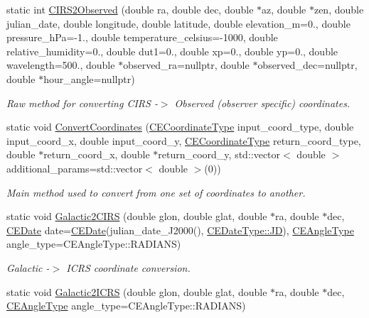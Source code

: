 \begin{DoxyCompactItemize}
static int \hyperlink{class_c_e_coordinates_aa77d308ed8537f8cd42df293e51c5eb6}{C\+I\+R\+S2\+Observed} (double ra, double dec, double $\ast$az, double $\ast$zen, double julian\+\_\+date, double longitude, double latitude, double elevation\+\_\+m=0., double pressure\+\_\+h\+Pa=-\/1., double temperature\+\_\+celsius=-\/1000, double relative\+\_\+humidity=0., double dut1=0., double xp=0., double yp=0., double wavelength=500., double $\ast$observed\+\_\+ra=nullptr, double $\ast$observed\+\_\+dec=nullptr, double $\ast$hour\+\_\+angle=nullptr)
\begin{DoxyCompactList}\small\item\em Raw method for converting C\+I\+R\+S -\/$>$ Observed (observer specific) coordinates. \end{DoxyCompactList}\item 
static void \hyperlink{class_c_e_coordinates_aa29c61ff89222c311236c48120d1120f}{Convert\+Coordinates} (\hyperlink{_c_e_coordinates_8h_a2198dc50406b64707964f5c1e8b32db2}{C\+E\+Coordinate\+Type} input\+\_\+coord\+\_\+type, double input\+\_\+coord\+\_\+x, double input\+\_\+coord\+\_\+y, \hyperlink{_c_e_coordinates_8h_a2198dc50406b64707964f5c1e8b32db2}{C\+E\+Coordinate\+Type} return\+\_\+coord\+\_\+type, double $\ast$return\+\_\+coord\+\_\+x, double $\ast$return\+\_\+coord\+\_\+y, std\+::vector$<$ double $>$ additional\+\_\+params=std\+::vector$<$ double $>$(0))
\begin{DoxyCompactList}\small\item\em Main method used to convert from one set of coordinates to another. \end{DoxyCompactList}\item 
static void \hyperlink{class_c_e_coordinates_a151ed16f68eb28adbb85f8895879d908}{Galactic2\+C\+I\+R\+S} (double glon, double glat, double $\ast$ra, double $\ast$dec, \hyperlink{class_c_e_date}{C\+E\+Date} date=\hyperlink{class_c_e_date}{C\+E\+Date}(julian\+\_\+date\+\_\+\+J2000(), \hyperlink{_c_e_date_8h_aa6b826beca26b0712061a4afc5ad7746aabf8d7515962e526421842e8456798cc}{C\+E\+Date\+Type\+::\+J\+D}), \hyperlink{namespace_cpp_ephem_a9a974f6ccf329e8cb5f9208b725f15ef}{C\+E\+Angle\+Type} angle\+\_\+type=C\+E\+Angle\+Type\+::\+R\+A\+D\+I\+A\+N\+S)
\begin{DoxyCompactList}\small\item\em Galactic -\/$>$ I\+C\+R\+S coordinate conversion. \end{DoxyCompactList}\item 
static void \hyperlink{class_c_e_coordinates_afa288c6036d21ed291dc37d11314443b}{Galactic2\+I\+C\+R\+S} (double glon, double glat, double $\ast$ra, double $\ast$dec, \hyperlink{namespace_cpp_ephem_a9a974f6ccf329e8cb5f9208b725f15ef}{C\+E\+Angle\+Type} angle\+\_\+type=C\+E\+Angle\+Type\+::\+R\+A\+D\+I\+A\+N\+S)

\end{DoxyCompactItemize}
